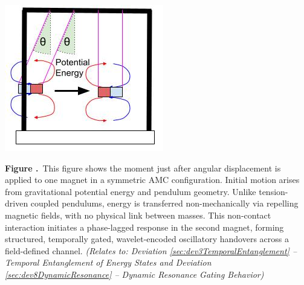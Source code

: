 \documentclass[10pt,aps,pre,onecolumn,superscriptaddress,notitlepage]{revtex4-2}
\renewcommand{\thefigure}{\arabic{figure}}
\begin{document}
\begin{center}
  \begin{minipage}[c]{0.36\linewidth}
    \includegraphics[width=\linewidth]{figures/AK1_AMC_RMI_MOTION_POTENTIAL.jpg}
  \end{minipage}%
  \hfill
  \begin{minipage}[c]{0.5\linewidth}
    \textbf{Figure \thefigure.}~This figure shows the moment just after angular displacement is applied to one magnet in a symmetric AMC configuration. Initial motion arises from gravitational potential energy and pendulum geometry. Unlike tension-driven coupled pendulums, energy is transferred non-mechanically via repelling magnetic fields, with no physical link between masses. This non-contact interaction initiates a phase-lagged response in the second magnet, forming structured, temporally gated, wavelet-encoded oscillatory handovers across a field-defined channel. \textit{(Relates to: Deviation \ref{sec:dev3TemporalEntanglement} – Temporal Entanglement of Energy States and Deviation \ref{sec:dev8DynamicResonance} – Dynamic Resonance Gating Behavior)}
    \label{fig:amc_motion_potential}
  \end{minipage}

  \vspace{1.7cm}


\end{center}
\end{document}
